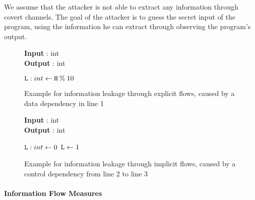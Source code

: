 We assume that the attacker is not able to extract any information through covert channels. The goal of the attacker is to guess the secret input of the program, using the information he can extract through observing the program's output.

\begin{figure}
    \centering
    \begin{minipage}{.7\linewidth}
        \begin{algorithm}[H]
            \hspace*{\algorithmicindent} \textbf{Input} \In: int \\
            \hspace*{\algorithmicindent} \textbf{Output} \Out: int
            \hspace*{1em}
            \begin{algorithmic}[1]
                \State $\mathtt{L}: int \leftarrow \mathtt{H} \: \% \: 10$
            \end{algorithmic} 
        \end{algorithm}
\end{minipage}
\caption{Example for information leakage through explicit flows, caused by a data dependency in line 1}
\label{fig:exEx}
\end{figure}

\begin{figure}
    \centering
    \begin{minipage}{.7\linewidth}
        \begin{algorithm}[H]
            \hspace*{\algorithmicindent} \textbf{Input} \In: int \\
            \hspace*{\algorithmicindent} \textbf{Output} \Out: int
            \hspace*{1em}
            \begin{algorithmic}[1]
                \State $\mathtt{L}: int \leftarrow 0$
                \State $\mathtt{L} \leftarrow 1$
                \EndIf
            \end{algorithmic} 
        \end{algorithm}
\end{minipage}
\caption{Example for information leakage through implicit flows, caused by a control dependency from line 2 to line 3}
\label{fig:ifEx}
\end{figure}

\paragraph{Information Flow Measures}\label{ch:measures}

